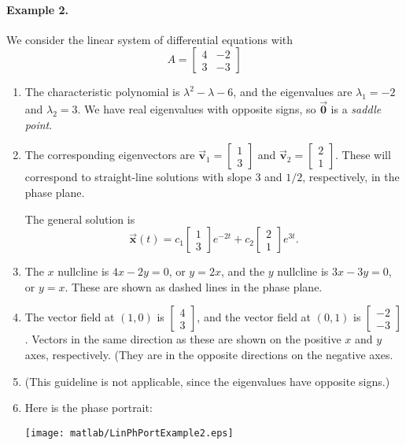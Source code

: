 \documentclass{book}
\newcommand{\BV}{\vec{\textbf{v}}}
\newcommand{\BX}{\vec{\textbf{x}}}
\newcommand{\BZ}{\vec{\textbf{0}}}  %
\begin{document}
\paragraph{Example 2.}
We consider the linear system of differential equations
with
\[
   A = \begin{bmatrix}
            4 & -2 \\ 3 & -3
       \end{bmatrix}
\]
\begin{enumerate}
\item
The characteristic polynomial is
$\lambda^2 -\lambda -6$, and the eigenvalues are
$\lambda_1 = -2$ and $\lambda_2 = 3$.
We have real eigenvalues with opposite signs, so
$\BZ$ is a \emph{saddle point}.
\item
The corresponding eigenvectors are
$\BV_1 = \begin{bmatrix} 1 \\ 3 \end{bmatrix}$
and
$\BV_2 = \begin{bmatrix} 2 \\ 1 \end{bmatrix}$.
These will correspond to straight-line solutions with
slope $3$ and $1/2$, respectively, in the phase plane.

The general solution is
\begin{equation}
\BX(t) = c_1 \begin{bmatrix} 1 \\ 3 \end{bmatrix} e^{-2t}
   + c_2 \begin{bmatrix} 2 \\ 1 \end{bmatrix} e^{3t}.
\end{equation}
\item
The $x$ nullcline is $4x-2y=0$, or $y = 2x$, and the
$y$ nullcline is $3x-3y=0$, or $y=x$.  These are shown
as dashed lines in the phase plane.
\item
The vector field at $(1,0)$ is $\begin{bmatrix} 4 \\ 3 \end{bmatrix}$,
and the vector field at $(0,1)$
is $\begin{bmatrix} -2 \\ -3 \end{bmatrix}$.  Vectors in the
same direction as these are shown on the positive $x$ and $y$ axes,
respectively.
(They are in the opposite directions on the negative axes.
\item
(This guideline is not applicable, since the eigenvalues
have opposite signs.)
\item
Here is the phase portrait:

\noindent
\centerline{\texttt{[image: matlab/LinPhPortExample2.eps]}}
\end{enumerate}
\end{document}
